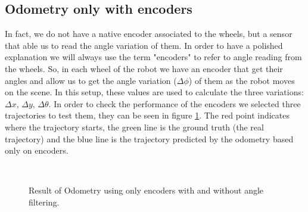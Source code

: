 \documentclass[twoside,conference,a4paper]{IEEEtran}
\begin{document}
\subsection{Odometry only with encoders}
In fact, we do not have a native encoder associated to the wheels, but a sensor that able us to read the angle variation
of them. In order to have a polished explanation we will always use the term "encoders" to refer to angle reading from the
wheels. So, in each wheel of the robot we have an encoder that get their angles and allow us to get the angle variation ($ \Delta \phi $)
of them as the robot moves on the scene. In this setup, these values are used to calculate the three variations: $ \Delta x $, $ \Delta y $, $ \Delta \theta $. 
In order to check the performance of the encoders we selected three 
trajectories to test them, they can be seen in figure \ref{fig:encoders_odometry}. The red point indicates where the trajectory starts, the green 
line is the ground truth (the real trajectory) and the blue line is the trajectory predicted by the odometry based only 
on encoders.


\begin{figure}[h]
\begin{center}
{} \hspace{0.1cm}
 \\
\caption{Result of Odometry using only encoders with and without angle filtering.}
\label{fig:encoders_odometry}
\end{center}
\end{figure}
\end{document}
